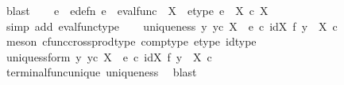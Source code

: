 \begin{isabellebody}
\ blast\isanewline
\ \ \isamarkupfalse%
\ e\ \ e{\isacharunderscore}{\kern0pt}defn{\isacharcolon}{\kern0pt}\ {\isachardoublequoteopen}e\ {\isacharequal}{\kern0pt}\ eval{\isacharunderscore}{\kern0pt}func\ {\isasymone}\ X{\isachardoublequoteclose}\ \ e{\isacharunderscore}{\kern0pt}type{\isacharcolon}{\kern0pt}\ {\isachardoublequoteopen}e\ {\isacharcolon}{\kern0pt}\ X\ {\isasymtimes}\isactrlsub c\ {\isasymone}\isactrlbsup X\isactrlesup \ {\isasymrightarrow}\ {\isasymone}{\isachardoublequoteclose}\isanewline
\ \ \ \ \isamarkupfalse%
\ {\isacharparenleft}{\kern0pt}simp\ add{\isacharcolon}{\kern0pt}\ eval{\isacharunderscore}{\kern0pt}func{\isacharunderscore}{\kern0pt}type{\isacharparenright}{\kern0pt}\isanewline
\ \ \isamarkupfalse%
\ uniqueness{\isacharcolon}{\kern0pt}\ {\isachardoublequoteopen}{\isasymforall}y{\isachardot}{\kern0pt}\ {\isacharparenleft}{\kern0pt}y{\isasymin}\isactrlsub c\ {\isasymone}\isactrlbsup X\isactrlesup \ {\isasymlongrightarrow}\ e\ {\isasymcirc}\isactrlsub c\ {\isacharparenleft}{\kern0pt}id{\isacharparenleft}{\kern0pt}X{\isacharparenright}{\kern0pt}\ {\isasymtimes}\isactrlsub f\ y{\isacharparenright}{\kern0pt}\ {\isacharcolon}{\kern0pt}\ X\ {\isasymtimes}\isactrlsub c\ {\isasymone}\ \ {\isasymrightarrow}\ {\isasymone}{\isacharparenright}{\kern0pt}{\isachardoublequoteclose}\isanewline
\ \ \ \ \isamarkupfalse%
\ {\isacharparenleft}{\kern0pt}meson\ cfunc{\isacharunderscore}{\kern0pt}cross{\isacharunderscore}{\kern0pt}prod{\isacharunderscore}{\kern0pt}type\ comp{\isacharunderscore}{\kern0pt}type\ e{\isacharunderscore}{\kern0pt}type\ id{\isacharunderscore}{\kern0pt}type{\isacharparenright}{\kern0pt}\isanewline
\ \ \isamarkupfalse%
\ uniquess{\isacharunderscore}{\kern0pt}form{\isacharcolon}{\kern0pt}\ {\isachardoublequoteopen}{\isasymforall}y{\isachardot}{\kern0pt}\ {\isacharparenleft}{\kern0pt}y{\isasymin}\isactrlsub c\ {\isasymone}\isactrlbsup X\isactrlesup \ {\isasymlongrightarrow}\ e\ {\isasymcirc}\isactrlsub c\ {\isacharparenleft}{\kern0pt}id{\isacharparenleft}{\kern0pt}X{\isacharparenright}{\kern0pt}\ {\isasymtimes}\isactrlsub f\ y{\isacharparenright}{\kern0pt}\ {\isacharequal}{\kern0pt}\ {\isasymbeta}\isactrlbsub X\ {\isasymtimes}\isactrlsub c\ {\isasymone}\isactrlesub {\isacharparenright}{\kern0pt}{\isachardoublequoteclose}\isanewline
\ \ \ \ \isamarkupfalse%
\ terminal{\isacharunderscore}{\kern0pt}func{\isacharunderscore}{\kern0pt}unique\ uniqueness\ \isamarkupfalse%
\ blast\isanewline

\end{isabellebody}
